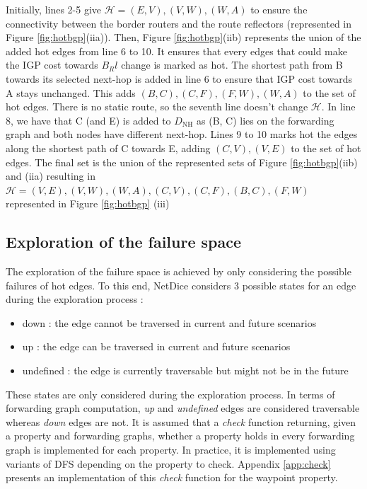 Initially, lines 2-5 give $\mathcal{H} = {(E,V), (V,W), (W,A)}$ to ensure the connectivity between the border routers and the route reflectors (represented in  Figure \ref{fig:hotbgp}(iia)).
Then, Figure \ref{fig:hotbgp}(iib) represents the union of the added hot edges from line 6 to 10. It ensures that every edges that could make the IGP cost towards $B_Rl$ change is marked as hot.
The shortest path from B towards its selected next-hop is added in line 6 to ensure that IGP cost towards A stays unchanged. This adds ${(B,C), (C,F), (F,W), (W,A)}$ to the set of hot edges.
There is no static route, so the seventh line doesn't change $\mathcal{H}$.
In line 8, we have that C (and E) is added to $D_{\text{NH}}$ as  (B, C) lies on the forwarding graph and both nodes have different next-hop.
Lines 9 to 10 marks hot the edges along the shortest path of C towards E, adding ${(C,V), (V,E)}$ to the set of hot edges.
The final set is the union of the represented sets of Figure \ref{fig:hotbgp}(iib) and (iia) resulting in $\mathcal{H} = {(V,E), (V,W), (W,A), (C,V), (C,F), (B,C), (F,W)}$ represented in Figure \ref{fig:hotbgp} (iii)




\subsection{Exploration of the failure space}\label{sec:explo}
The exploration of the failure space is achieved by only considering the possible failures of hot edges. 
To this end, NetDice considers 3 possible states for an edge during the exploration process : 
\begin{itemize}
  \item down : the edge cannot be traversed in current and future scenarios  
  \item up : the edge can be traversed in current and future scenarios  
  \item undefined : the edge is currently traversable but might not be in the future
\end{itemize}

These states are only considered during the exploration process.
In terms of forwarding graph computation, \textit{up} and \textit{undefined} edges are considered traversable whereas \textit{down} edges are not. 
It is assumed that a \textit{check} function returning, given a property and forwarding graphs, whether a property holds in every forwarding graph is implemented for each property.
In practice, it is implemented using variants of DFS depending on the property to check. 
Appendix \ref{app:check} presents an implementation of this \textit{check} function for the waypoint property. 

